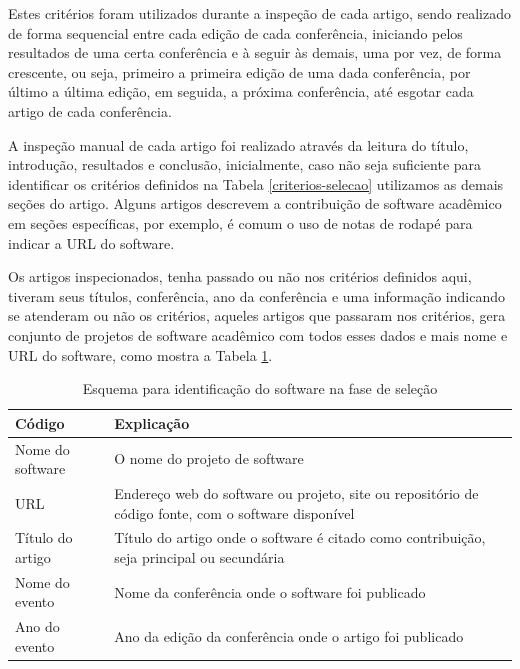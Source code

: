 Estes critérios foram utilizados durante a inspeção de cada artigo, sendo
realizado de forma sequencial entre cada edição de cada conferência, iniciando
pelos resultados de uma certa conferência e à seguir às demais, uma por vez, de
forma crescente, ou seja, primeiro a primeira edição de uma dada conferência,
por último a última edição, em seguida, a próxima conferência, até esgotar cada
artigo de cada conferência.


A inspeção manual de cada artigo foi realizado através da leitura do título,
introdução, resultados e conclusão, inicialmente, caso não seja suficiente para
identificar os critérios definidos na Tabela \ref{criterios-selecao} utilizamos
as demais seções do artigo. Alguns artigos descrevem a contribuição de software
acadêmico em seções específicas, por exemplo, é comum o uso de notas de rodapé
para indicar a URL do software.

Os artigos inspecionados, tenha passado ou não nos critérios definidos aqui,
tiveram seus títulos, conferência, ano da conferência e uma informação
indicando se atenderam ou não os critérios, aqueles artigos que passaram nos
critérios, gera conjunto de projetos de software acadêmico com todos esses
dados e mais nome e URL do software, como mostra a Tabela \ref{esquema-selecao}.

\begin{table}[h]
\caption{Esquema para identificação do software na fase de seleção}
\centering
\begin{tabular}{ l p{11cm} }
  \hline
  Código                   & Explicação \\
  \hline
  Nome do software         & O nome do projeto de software \\
  URL                      & Endereço web do software ou projeto, site ou repositório de código fonte, com o software disponível \\
  Título do artigo         & Título do artigo onde o software é citado como contribuição, seja principal ou secundária \\
  Nome do evento           & Nome da conferência onde o software foi publicado \\
  Ano do evento            & Ano da edição da conferência onde o artigo foi publicado \\
  \hline
\end{tabular}
\label{esquema-selecao}
\end{table}

